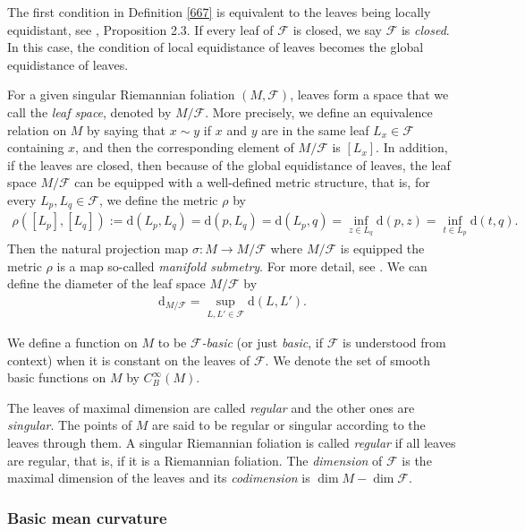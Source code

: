 \documentclass[11pt]{amsart}
\def\d{\mathrm{d}}
\begin{document}
The first condition in Definition \ref{667} is equivalent to the leaves being locally equidistant, see \cite{radeschi}, Proposition 2.3. If every leaf of $\mathcal{F}$ is closed, we say $\mathcal{F}$ is \textit{closed}. In this case, the condition of local equidistance of leaves becomes the global equidistance of leaves.

For a given singular Riemannian foliation $(M,\mathcal{F})$, leaves form a space that we call the \textit{leaf space}, denoted by $M/\mathcal{F}$. More precisely, we define an equivalence relation on $M$ by saying that $x\sim y$ if $x$ and $y$ are in the same leaf $L_x\in\mathcal{F}$ containing $x$, and then the corresponding element of $M/\mathcal{F}$ is $[L_x]$. In addition, if the leaves are closed, then because of the global equidistance of leaves, the leaf space $M/\mathcal{F}$ can be equipped with a well-defined metric structure, that is, for every $L_p,L_q\in \mathcal{F}$, we define the metric $\rho$ by \begin{align*}
    \rho([L_p],[L_q]):=\d(L_p, L_q)=\d(p,L_q)=\d(L_p,q)=\inf_{z\in L_q}\d(p,z)=\inf_{t\in L_p}\d(t,q).
\end{align*} Then the natural projection map $\sigma:M\to M/\mathcal{F}$ where $M/\mathcal{F}$ is equipped the metric $\rho$ is a map so-called \textit{manifold submetry}. For more detail, see \cite{mendesradeschi}. We can define the diameter of the leaf space $M/\mathcal{F}$ by
\begin{align*}
    \d_{M/\mathcal{F}}=\sup_{L,L'\in \mathcal{F}}\d(L,L').
\end{align*}


We define a function on $M$ to be \textit{$\mathcal{F}$-basic} (or just \textit{basic}, if $\mathcal{F}$ is understood from context) when it is constant on the leaves of $\mathcal{F}$. We denote the set of smooth basic functions on $M$ by $C_B^\infty(M)$.


 The leaves of maximal dimension are called \textit{regular} and the other ones are \textit{singular}. The points of $M$ are said to be regular or singular according to the leaves through them. A singular Riemannian foliation is called \textit{regular} if all leaves are regular, that is, if it is a Riemannian foliation. The \textit{dimension} of $\mathcal{F}$ is the maximal dimension of the leaves and its \textit{codimension} is $\dim M-\dim\mathcal{F}$.
\subsubsection{Basic mean curvature}
\end{document}
